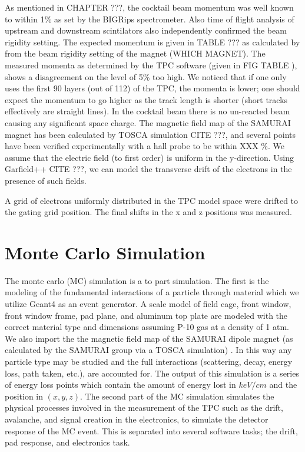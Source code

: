 As mentioned in CHAPTER ???, the cocktail beam momentum was well known to within 1\% as set by the BIGRips spectrometer. Also time of flight analysis of upstream and downstream scintilators also independently confirmed the beam rigidity setting. The expected momentum is given in TABLE ??? as calculated by from the beam rigidity setting of the magnet (WHICH MAGNET). The measured momenta as determined by the TPC software (given in FIG TABLE ), shows a disagreement on the level of 5\% too high. We noticed that if one only uses the first 90 layers (out of 112) of the TPC, the momenta is lower; one should expect the momentum to go higher as the track length is shorter (short tracks effectively are straight lines). 
In the cocktail beam there is no un-reacted beam causing any significant space charge. The magnetic field map of the SAMURAI magnet has been calculated by TOSCA simulation CITE ???, and several points have been verified experimentally with a hall probe to be within XXX \%. We assume that the electric field (to first order) is uniform in the y-direction. Using Garfield++ CITE ???, we can model the transverse drift of the electrons in the presence of such fields. 

A grid of electrons uniformly distributed in the TPC model space were drifted to the gating grid position. The final shifts in the x and z positions was measured. 


\section{Monte Carlo Simulation}
The monte carlo (MC) simulation is a to part simulation. The first is the modeling of the fundamental interactions of a particle through material which we utilize Geant4 as an event generator. A scale model of field cage, front window, front window frame, pad plane, and aluminum top plate are modeled with the correct material type and dimensions assuming P-10 gas at a density of 1 atm. We also import the the magnetic field map of the SAMURAI dipole magnet (as calculated by the SAMURAI group via a TOSCA simulation) \cite{magnet}.  In this way any particle type may be studied and the full interactions (scattering, decay, energy loss, path taken, etc.), are accounted for. The output of this simulation is a series of energy loss points which contain the amount of energy lost in $keV/cm$ and the position in $(x,y,z)$. The second part of the MC simulation simulates the physical processes involved in the measurement of the TPC such as the drift, avalanche, and signal creation in the electronics, to simulate the detector response of the MC event. This is separated into several software tasks; the drift, pad response, and electronics task. 

